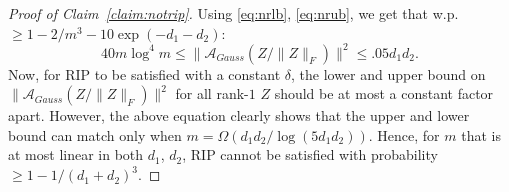 \documentclass[11pt]{article}
\newcommand{\Tr}{\operatorname{Tr}}
\newcommand{\calN}{{\cal N}}
\newcommand{\R}{\mathbb{R}}
\newcommand{\tp}[1]{{#1}^{T}}
\newcommand{\calA}{\mathcal{A}}
\newcommand{\Wo}{W_*}
\newcommand{\x}{\bm{x}}
\newcommand{\y}{\bm{y}}
\renewcommand{\b}{\bm{b}}
\begin{document}
\begin{proof}[Proof of Claim~\ref{claim:notrip}]
Using \eqref{eq:nrlb}, \eqref{eq:nrub}, we get that w.p.  $\geq 1-2/m^3-10 \exp(-d_1-d_2)$: $$40m \log^4m\leq  \|\calA_{Gauss}(Z/\|Z\|_F)\|^2\leq .05 d_1d_2.$$
Now, for RIP to be satisfied with a constant $\delta$, the lower and upper bound on $\|\calA_{Gauss}(Z/\|Z\|_F)\|^2$ for all rank-$1$ $Z$ should be at most a constant factor apart. However, the above equation clearly shows that the upper and lower bound can match only when $m=\Omega(d_1d_2/\log(5d_1d_2))$. Hence, for $m$ that is at most linear in both $d_1$, $d_2$, RIP cannot be satisfied with probability $\geq 1-1/(d_1+d_2)^3$. 
\end{proof}

\end{document}
